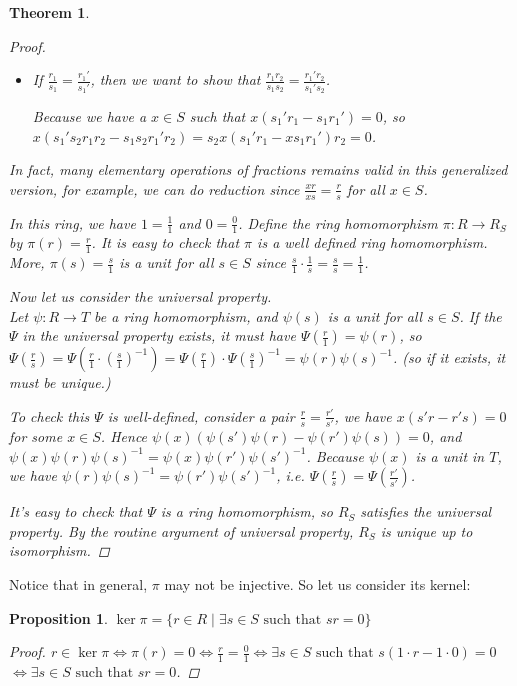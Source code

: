 \documentclass[a4paper]{article}
\theoremstyle{mystyle}
\newtheorem{theorem}{Theorem}
\newtheorem{prop}{Proposition}
\begin{document}
\begin{theorem}
\begin{proof}
\begin{itemize}
      \item 
        If $\frac{r_1}{s_1} = \frac{r_1'}{s_1'}$, then we want to show that
        $\frac{r_1r_2}{s_1s_2} = \frac{r_1'r_2}{s_1's_2}$.

        Because we have a $x \in S$ such that $x(s_1'r_1 - s_1r_1') = 0$, so 
        $x(s_1's_2r_1r_2 - s_1s_2r_1'r_2) = s_2x(s_1'r_1 - xs_1r_1')r_2 = 0$.
    \end{itemize}

    In fact, many elementary operations of fractions remains valid in this generalized
    version, for example, we can do reduction since $\frac{xr}{xs} = \frac{r}{s}$ for all $x \in S$.

    In this ring, we have $1 = \frac{1}{1}$ and $0 = \frac{0}{1}$. 
    Define the ring homomorphism $\pi : R \to R_S$
    by $\pi(r) = \frac{r}{1}$. It is easy to check that $\pi$ is a well defined 
    ring homomorphism. More, $\pi(s) = \frac{s}{1}$ is a unit for all $s \in S$ since
    $\frac{s}{1} \cdot \frac{1}{s} = \frac{s}{s} = \frac{1}{1}$.

    Now let us consider the universal property.\\
    Let $\psi : R \to T$ be a ring homomorphism, and $\psi(s)$ is a unit for all $s \in S$.
    If the $\Psi$ in the universal property exists,
    it must have $\Psi(\frac{r}{1}) = \psi(r)$, so
    $\Psi(\frac{r}{s}) = \Psi(\frac{r}{1} \cdot (\frac{s}{1})^{-1})
    = \Psi(\frac{r}{1}) \cdot \Psi(\frac{s}{1})^{-1} = \psi(r) \psi(s)^{-1}$.
    (so if it exists, it must be unique.)

    To check this $\Psi$ is well-defined, consider a pair $\frac{r}{s} = \frac{r'}{s'}$, we have
    $x(s'r-r's) = 0$ for some $x \in S$. Hence $\psi(x)(\psi(s')\psi(r) - \psi(r')\psi(s)) = 0$, 
    and $\psi(x)\psi(r)\psi(s)^{-1} = \psi(x)\psi(r')\psi(s')^{-1}$. Because
    $\psi(x)$ is a unit in $T$, we have $\psi(r)\psi(s)^{-1} = \psi(r')\psi(s')^{-1}$, 
    i.e. $\Psi(\frac{r}{s}) = \Psi(\frac{r'}{s'})$.

    It's easy to check that $\Psi$ is a ring homomorphism, so $R_S$
    satisfies the universal property.
    By the routine argument of universal property, $R_S$ is unique up to isomorphism.
  \end{proof}
\end{theorem}

Notice that in general, $\pi$ may not be injective. So let us consider its kernel:

\begin{prop}
  $\ker \pi = \{r \in R \mid \exists s \in S \textrm{ such that } sr = 0\}$
  \begin{proof}
    $r \in \ker \pi \iff \pi(r) = 0 \iff \frac{r}{1} = \frac{0}{1} \iff 
    \exists s \in S \textrm{ such that } s(1 \cdot r - 1 \cdot 0) = 0$
    $\iff \exists s \in S \textrm{ such that } sr = 0$.
  \end{proof}
\end{prop}
\end{document}
